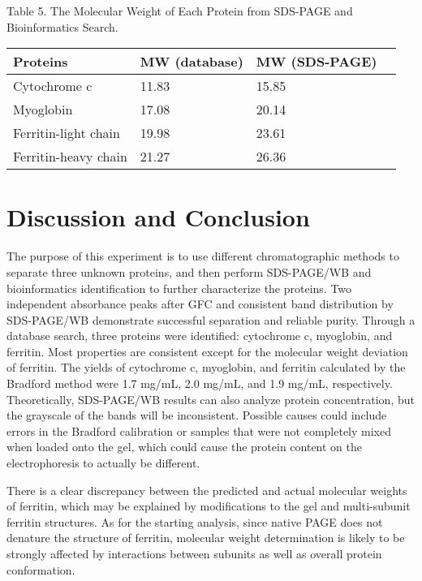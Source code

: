 \documentclass[a4paper,10pt]{article}
\begin{document}
\begin{multicols}{2}
\begin{center}
{Table 5. The Molecular Weight of Each Protein from SDS-PAGE and Bioinformatics Search.}
\vspace{0pt}
\begin{table}[H]
\setlength{\tabcolsep}{5pt}
\footnotesize
\begin{tabular}{llll}
\toprule [1pt]
Proteins&MW (database)&MW (SDS-PAGE)\\
\hline
Cytochrome c & 11.83 & 15.85\\
Myoglobin & 17.08 & 20.14\\
Ferritin-light chain & 19.98 & 23.61\\
Ferritin-heavy chain & 21.27 & 26.36\\
\bottomrule [1pt]
\end{tabular}
\end{table}
\end{center}


\section{Discussion and Conclusion}


The purpose of this experiment is to use different chromatographic methods to separate three unknown proteins, and then perform SDS-PAGE/WB and bioinformatics identification to further characterize the proteins. Two independent absorbance peaks after GFC and consistent band distribution by SDS-PAGE/WB demonstrate successful separation and reliable purity. Through a database search, three proteins were identified: cytochrome c, myoglobin, and ferritin. Most properties are consistent except for the molecular weight deviation of ferritin. The yields of cytochrome c, myoglobin, and ferritin calculated by the Bradford method were 1.7 mg/mL, 2.0 mg/mL, and 1.9 mg/mL, respectively. Theoretically, SDS-PAGE/WB results can also analyze protein concentration, but the grayscale of the bands will be inconsistent. Possible causes could include errors in the Bradford calibration or samples that were not completely mixed when loaded onto the gel, which could cause the protein content on the electrophoresis to actually be different.

There is a clear discrepancy between the predicted and actual molecular weights of ferritin, which may be explained by modifications to the gel and multi-subunit ferritin structures. As for the starting analysis, since native PAGE does not denature the structure of ferritin, molecular weight determination is likely to be strongly affected by interactions between subunits as well as overall protein conformation.


\end{multicols}
\end{document}
